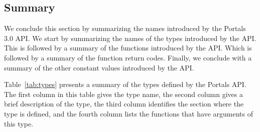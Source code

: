 \documentclass{sand-report}
\begin{document}
\subsection{Summary}
We conclude this section by summarizing the names introduced by the
Portals 3.0 API.  We start by summarizing the names of the types
introduced by the API.  This is followed by a summary of the functions
introduced by the API.  Which is followed by a summary of the function
return codes.  Finally, we conclude with a summary of the other
constant values introduced by the API.

Table~\ref{tab:types} presents a summary of the types defined by the
Portals API.  The first column in this table gives the type name, the
second column gives a brief description of the type, the third column
identifies the section where the type is defined, and the fourth
column lists the functions that have arguments of this type.
\end{document}
